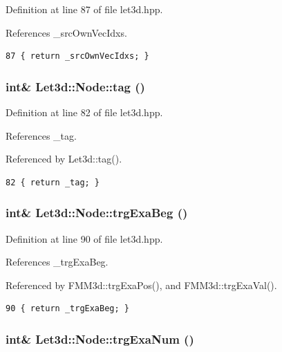Definition at line 87 of file let3d.hpp.

References \_\-src\-Own\-Vec\-Idxs.

\footnotesize\begin{verbatim}87 { return _srcOwnVecIdxs; }
\end{verbatim}\normalsize 


\subsubsection{\setlength{\rightskip}{0pt plus 5cm}int\& Let3d::Node::tag ()\hspace{0.3cm}{\tt  [inline]}}\label{classLet3d_1_1Node_58cc1da510029fc48aaa41b18ee51750_58cc1da510029fc48aaa41b18ee51750}




Definition at line 82 of file let3d.hpp.

References \_\-tag.

Referenced by Let3d::tag().

\footnotesize\begin{verbatim}82 { return _tag; }
\end{verbatim}\normalsize 


\subsubsection{\setlength{\rightskip}{0pt plus 5cm}int\& Let3d::Node::trg\-Exa\-Beg ()\hspace{0.3cm}{\tt  [inline]}}\label{classLet3d_1_1Node_f7df4c929d172b69c54506501800c3e4_f7df4c929d172b69c54506501800c3e4}




Definition at line 90 of file let3d.hpp.

References \_\-trg\-Exa\-Beg.

Referenced by FMM3d::trg\-Exa\-Pos(), and FMM3d::trg\-Exa\-Val().

\footnotesize\begin{verbatim}90 { return _trgExaBeg; }
\end{verbatim}\normalsize 


\subsubsection{\setlength{\rightskip}{0pt plus 5cm}int\& Let3d::Node::trg\-Exa\-Num ()\hspace{0.3cm}{\tt  [inline]}}\label{classLet3d_1_1Node_9ea862179474a204db7b8f71d6e32cc9_9ea862179474a204db7b8f71d6e32cc9}




